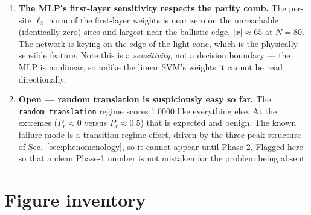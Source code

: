 \documentclass[11pt]{article}
\newcommand{\Prand}{P_{r}}                          %
\begin{document}
\begin{enumerate}
\item \textbf{The MLP's first-layer sensitivity respects the parity comb.}
The per-site $\ell_2$ norm of the first-layer weights is near zero on the
unreachable (identically zero) sites and largest near the ballistic edge,
$|x| \approx 65$ at $N=80$. The network is keying on the edge of the light
cone, which is the physically sensible feature. Note this is a
\emph{sensitivity}, not a decision boundary --- the MLP is nonlinear, so
unlike the linear SVM's weights it cannot be read directionally.

\item \textbf{Open --- random translation is suspiciously easy so far.}
The \texttt{random\_translation} regime scores $1.0000$ like everything else.
At the extremes ($\Prand \approx 0$ versus $\Prand \approx 0.5$) that is
expected and benign. The known failure mode is a transition-regime effect,
driven by the three-peak structure of Sec.~\ref{sec:phenomenology}, so it
cannot appear until Phase 2. Flagged here so that a clean Phase-1 number is
not mistaken for the problem being absent.

\end{enumerate}

\section{Figure inventory}
\label{sec:figures}
\end{document}
